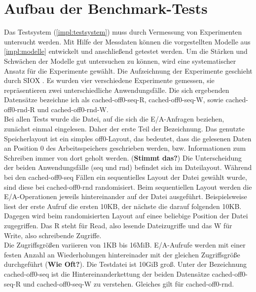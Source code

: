 \documentclass[
	12pt,
	a4paper,
	BCOR10mm,
	DIV14,
	listof=totoc,
	bibliography=totoc,
	headsepline
]{scrreprt}
\begin{document}

\section{Aufbau der Benchmark-Tests}
\label{benchmark}
Das Testsystem (\ref{impl:testsystem}) muss durch Vermessung von Experimenten untersucht werden. Mit Hilfe der Messdaten können die vorgestellten Modelle aus \ref{impl:modelle} entwickelt und anschließend getestet werden. Um die Stärken und Schwächen der Modelle gut untersuchen zu können, wird eine systematischer Ansatz für die Experimente gewählt. Die Aufzeichnung der Experimente geschieht durch SIOX \cite{UMLTPTPONI15}. Es wurden vier verschiedene Experimente gemessen, sie repräsentieren zwei unterschiedliche Anwendungsfälle. Die sich ergebenden Datensätze bezeichne ich als cached-off0-seq-R, cached-off0-seq-W, sowie cached-off0-rnd-R und cached-off0-rnd-W.\\
Bei allen Tests wurde die Datei, auf die sich die E/A-Anfragen beziehen, zunächst einmal eingelesen. Daher der erste Teil der Bezeichnung. Das genutzte Speicherlayout ist ein simples off0-Layout, das bedeutet, dass die gelesenen Daten an Position 0 des Arbeitsspeichers geschrieben werden, bzw. Informationen zum Schreiben immer von dort geholt werden. (\textbf{Stimmt das?})
Die Unterscheidung der beiden Anwendungsfälle (seq und rnd) befindet sich im Dateilayout. Während bei den cached-off0-seq Fällen ein sequentielles Layout der Datei gewählt wurde, sind diese bei cached-off0-rnd randomisiert. Beim sequentiellen Layout werden die E/A-Operationen jeweils hintereinander auf der Datei ausgeführt. Beispielsweise liest der erste Aufruf die ersten 10KB, der nächste die darauf folgenden 10KB. Dagegen wird beim randomisierten Layout auf einee beliebige Position der Datei zugegriffen. Das R steht für Read, also lesende Dateizugriffe und das W für Write, also schreibende Zugriffe.\\
Die Zugriffsgrößen variieren von 1KB bis 16MiB. E/A-Aufrufe werden mit einer festen Anzahl an Wiederholungen hintereinader mit der gleichen Zugriffsgröße durchgeführt (\textbf{Wie Oft?}). Die Testdatei ist 10GiB groß. Unter der Bezeichnung cached-off0-seq ist die Hintereinanderkettung der beiden Datensätze cached-off0-seq-R und cached-off0-seq-W zu verstehen. Gleiches gilt für cached-off0-rnd. 
\end{document}
